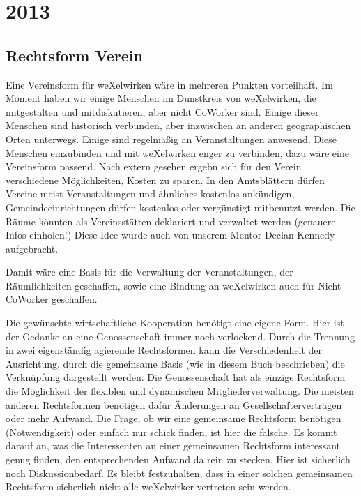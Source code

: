   \section{2013}
\subsection{Rechtsform Verein}
Eine Vereinsform für weXelwirken wäre in mehreren Punkten vorteilhaft.
%
Im Moment haben wir einige Menschen im Dunstkreis von weXelwirken, die mitgestalten und mitdiskutieren, aber nicht CoWorker sind.
%
Einige dieser Menschen sind historisch verbunden, aber inzwischen an anderen geographischen Orten unterwegs.
%
Einige sind regelmäßig an Veranstaltungen anwesend.
%
Diese Menschen einzubinden und mit weXelwirken enger zu verbinden, dazu wäre eine Vereinsform passend.
%
Nach extern gesehen ergebn sich für den Verein verschiedene Möglichkeiten, Kosten zu sparen.
%
In den Amtsblättern dürfen Vereine meist Veranstaltungen und ähnliches kostenlos ankündigen, Gemeindeeinrichtungen dürfen kostenlos oder vergünstigt mitbenutzt werden.
%
Die Räume könnten als Vereinsstätten deklariert und verwaltet werden (genauere Infos einholen!)
%
Diese Idee wurde auch von unserem Mentor Declan Kennedy aufgebracht.



Damit wäre eine Basis für die Verwaltung der Veranstaltungen, der Räumlichkeiten geschaffen, sowie eine Bindung an weXelwirken auch für Nicht CoWorker geschaffen.



Die gewünschte wirtschaftliche Kooperation benötigt eine eigene Form.
%
Hier ist der Gedanke an eine Genossenschaft immer noch verlockend.
%
Durch die Trennung in zwei eigenständig agierende Rechtsformen kann die Verschiedenheit der Ausrichtung, durch die gemeinsame Basis (wie in diesem Buch beschrieben) die Verknüpfung dargestellt werden.
%
Die Genossenschaft hat als einzige Rechtsform die Möglichkeit der flexiblen und dynamischen Mitgliederverwaltung.
%
Die meisten anderen Rechtsformen benötigen dafür Änderungen an Gesellschafterverträgen oder mehr Aufwand.
%
Die Frage, ob wir eine gemeinsame Rechtsform benötigen (Notwendigkeit) oder einfach nur schick finden, ist hier die falsche.
%
Es kommt darauf an, was die Interessenten an einer gemeinsamen Rechtsform interessant genug finden, den entsprechenden Aufwand da rein zu stecken.
%
Hier ist sicherlich noch Diskussionbedarf.
%
Es bleibt festzuhalten, dass in einer solchen gemeinsamen Rechtsform sicherlich nicht alle weXelwirker vertreten sein werden.

